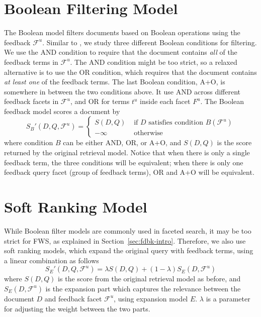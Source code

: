 \section{Boolean Filtering Model} \label{sec:fdbk-filter}
The Boolean model filters documents based on Boolean operations using the feedback $\mathcal{F}^u$. Similar to \citet{zhang2010interactive}, we study three different Boolean conditions for filtering. We use the AND condition to require that the document contains \emph{all} of the feedback terms in $\mathcal{F}^u$. The AND condition might be too strict, so a relaxed alternative is to use the OR condition, which requires that the document contains \emph{at least one} of the feedback terms. The last Boolean condition, A+O, is somewhere in between the two conditions above. It use AND across different feedback facets in $\mathcal{F}^u$, and OR for terms $t^u$ inside each facet $F^u$. The Boolean feedback model scores a document by
\begin{equation}
S_{B}'(D,Q,\mathcal{F}^u) = \left\{ \begin{array}{ll}
S(D,Q) &\mbox{ if $D$ satisfies condition $B(\mathcal{F}^u)$} \\
-\infty &\mbox{ otherwise}
\end{array} \right.
\end{equation}
where condition $B$ can be either AND, OR, or A+O, and $S(D,Q)$ is the score returned by the original retrieval model. Notice that when there is only a single feedback term, the three conditions will be equivalent; when there is only one feedback query facet (group of feedback terms), OR and A+O will be equivalent.

\section{Soft Ranking Model} \label{sec:fdbk-ranking}
While Boolean filter models are commonly used in faceted search, it may be too strict for FWS, as explained in Section~\ref{sec:fdbk-intro}. %
Therefore, we also use soft ranking models, which expand the original query with feedback terms, using a linear combination as follows
\begin{equation}
 S_E'(D,Q,\mathcal{F}^u) = \lambda S(D,Q) + (1-\lambda) S_E(D,\mathcal{F}^u)
\end{equation}
where $S(D,Q)$ is the score from the original retrieval model as before, and $S_E(D,\mathcal{F}^u)$ is the expansion part which captures the relevance between the document $D$ and feedback facet $\mathcal{F}^u$, using expansion model $E$. $\lambda$ is a parameter for adjusting the weight between the two parts. 

